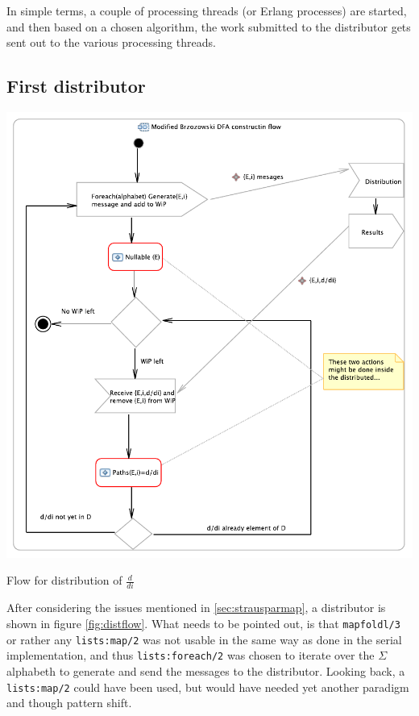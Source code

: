 \documentclass[a4paper,11pt]{report}
\begin{document}
In simple terms, a couple of processing threads (or Erlang processes)
are started, and then based on a chosen algorithm, the work submitted
to the distributor gets sent out to the various processing threads. 

\subsection{First distributor}
\label{sec:firstdist}

\begin{Figure}[htbp] %
	 \centering
	 \includegraphics[scale=1]{Activity.pdf} 
	 \caption{Flow for distribution of $\frac{d}{di}$}
	 \label{fig:distflow}
\end{Figure}
After considering the issues mentioned in \autoref{sec:strausparmap}, a
distributor is shown in figure \autoref{fig:distflow}. What needs to be
pointed out, is that \texttt{mapfoldl/3} or rather any
\texttt{lists:map/2} was not usable in the same way as done in the
serial implementation, and thus \texttt{lists:foreach/2} was chosen to
iterate over the $\Sigma$ alphabeth to generate
and send the messages to the distributor. Looking back, a
\texttt{lists:map/2} could have been used, but would have needed yet
another paradigm and though pattern shift.
\end{document}

